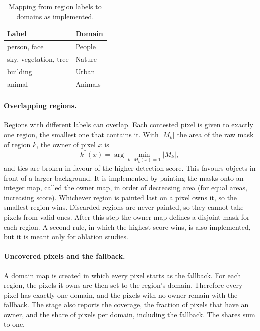 \documentclass{FastFyp}
\begin{document}
\begin{table}[!ht]
\centering
\caption{Mapping from region labels to domains as implemented.}
\label{tab:a_label_map}
\begin{tabular}{|l|l|}
\hline
\textbf{Label} & \textbf{Domain} \\ \hline
person, face & People \\ \hline
sky, vegetation, tree & Nature \\ \hline
building & Urban \\ \hline
animal & Animals \\ \hline
\end{tabular}
\end{table}

\paragraph{Overlapping regions.} Regions with different labels can overlap. Each contested pixel is given to exactly one region, the smallest one that contains it. With $|M_k|$ the area of the raw mask of region $k$, the owner of pixel $x$ is
\begin{equation}
k^{*}(x)=\arg\min_{k:\,M_k(x)=1}|M_k|,
\end{equation}
and ties are broken in favour of the higher detection score. This favours objects in front of a larger background. It is implemented by painting the masks onto an integer map, called the owner map, in order of decreasing area (for equal areas, increasing score). Whichever region is painted last on a pixel owns it, so the smallest region wins. Discarded regions are never painted, so they cannot take pixels from valid ones. After this step the owner map defines a disjoint mask for each region. A second rule, in which the highest score wins, is also implemented, but it is meant only for ablation studies.
 
\paragraph{Uncovered pixels and the fallback.} A domain map is created in which every pixel starts as the fallback. For each region, the pixels it owns are then set to the region's domain. Therefore every pixel has exactly one domain, and the pixels with no owner remain with the fallback. The stage also reports the coverage, the fraction of pixels that have an owner, and the share of pixels per domain, including the fallback. The shares sum to one.
 
\end{document}
